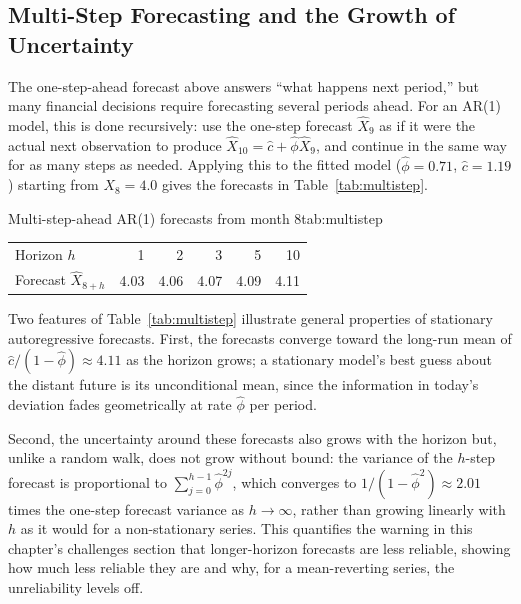 \documentclass[../ai_in_finance]{subfiles}
\begin{document}
\subsection{Multi-Step Forecasting and the Growth of Uncertainty}
\label{sec:multistep-forecast}

The one-step-ahead forecast above answers ``what happens next period,'' but many financial decisions require forecasting several periods ahead. For an AR(1) model, this is done recursively: use the one-step forecast $\hat X_9$ as if it were the actual next observation to produce $\hat X_{10} = \hat c + \hat\phi \hat X_9$, and continue in the same way for as many steps as needed. Applying this to the fitted model ($\hat\phi=0.71$, $\hat c=1.19$) starting from $X_8=4.0$ gives the forecasts in Table~\ref{tab:multistep}.

\begin{booktable}[htbp]{Multi-step-ahead AR(1) forecasts from month 8}{tab:multistep}
\begin{tabular}{lrrrrr}
\toprule
Horizon $h$ & 1 & 2 & 3 & 5 & 10 \\
Forecast $\hat X_{8+h}$ & 4.03 & 4.06 & 4.07 & 4.09 & 4.11 \\
\bottomrule
\end{tabular}
\end{booktable}

Two features of Table~\ref{tab:multistep} illustrate general properties of stationary autoregressive forecasts. First, the forecasts converge toward the long-run mean of $\hat c/(1-\hat\phi) \approx 4.11$ as the horizon grows; a stationary model's best guess about the distant future is its unconditional mean, since the information in today's deviation fades geometrically at rate $\hat\phi$ per period.

Second, the uncertainty around these forecasts also grows with the horizon but, unlike a random walk, does not grow without bound: the variance of the $h$-step forecast is proportional to $\sum_{j=0}^{h-1} \hat\phi^{2j}$, which converges to $1/(1-\hat\phi^2) \approx 2.01$ times the one-step forecast variance as $h \to \infty$, rather than growing linearly with $h$ as it would for a non-stationary series. This quantifies the warning in this chapter's challenges section that longer-horizon forecasts are less reliable, showing how much less reliable they are and why, for a mean-reverting series, the unreliability levels off.
\end{document}
